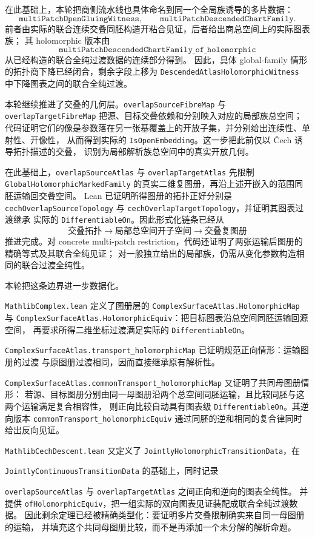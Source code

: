 \documentclass[UTF8,fontset=none,a4paper,11pt]{ctexart}
\begin{document}
在此基础上，本轮把商侧流水线也具体命名到同一个全局族诱导的多片数据：
\[
\texttt{multiPatchOpenGluingWitness},\qquad
\texttt{multiPatchDescendedChartFamily}.
\]
前者由实际的联合连续交叠同胚构造开粘合见证，后者给出商总空间上的实际图表族；
其 holomorphic 版本由
\[
\texttt{multiPatchDescendedChartFamily\_of\_holomorphic}
\]
从已经构造的联合全纯过渡数据的连续部分得到。
因此，具体 global-family 情形的拓扑商下降已经闭合，剩余字段上移为
\texttt{DescendedAtlasHolomorphicWitness} 中下降图表之间的联合全纯过渡。

本轮继续推进了交叠的几何层。\texttt{overlapSourceFibreMap} 与
\texttt{overlapTargetFibreMap} 把源、目标交叠依赖和分别映入对应的局部族总空间；
代码证明它们的像是参数落在另一张基覆盖上的开放子集，并分别给出连续性、单射性、开像性，
从而得到实际的 \texttt{IsOpenEmbedding}。这一步把此前仅以 Čech 诱导拓扑描述的交叠，
识别为局部解析族总空间中的真实开放几何。

在此基础上，\texttt{overlapSourceAtlas\allowbreak} 与
\texttt{overlapTargetAtlas\allowbreak} 先限制
\texttt{GlobalHolomorphic\allowbreak MarkedFamily} 的真实二维复图册，再沿上述开嵌入的范围同胚运输回交叠空间。
Lean 已证明所得图册的拓扑正好分别是
\texttt{cechOverlapSourceTopology} 与 \texttt{cechOverlapTargetTopology}，并证明其图表过渡继承
实际的 \texttt{DifferentiableOn}。因此形式化链条已经从
\[
  \text{交叠拓扑}\longrightarrow\text{局部总空间开子空间}
\longrightarrow\text{交叠复图册}
\]
推进完成。对 concrete multi-patch restriction，代码还证明了两张运输后图册的精确等式及其联合全纯见证；
对一般独立给出的局部族，仍需从变化参数构造相同的联合过渡全纯性。

本轮把这条边界进一步数据化。
\par
\texttt{MathlibComplex.\allowbreak lean} 定义了图册层的
\texttt{ComplexSurfaceAtlas.\allowbreak HolomorphicMap} 与
\texttt{ComplexSurfaceAtlas.\allowbreak HolomorphicEquiv}：把目标图表沿总空间同胚运输回源空间，
再要求所得二维坐标过渡满足实际的 \texttt{Differentiable\allowbreak On}。
\par
\texttt{ComplexSurfaceAtlas.\allowbreak transport\_holomorphic\allowbreak Map} 已证明规范正向情形：运输图册的过渡
与原图册过渡相同，因而直接继承原有解析性。
\par
\texttt{ComplexSurfaceAtlas.\allowbreak commonTransport\_holomorphic\allowbreak Map} 又证明了共同母图册情形：
若源、目标图册分别由同一母图册沿两个总空间同胚运输，且比较同胚与这两个运输满足复合相容性，
则正向比较自动具有图表级 \texttt{Differentiable\allowbreak On}。其逆向版本
\texttt{commonTransport\_holomorphic\allowbreak Equiv} 通过同胚的逆和相同的复合律同时给出反向见证。
\par
\texttt{MathlibCechDescent.\allowbreak lean} 又定义了
\texttt{JointlyHolomorphic\allowbreak TransitionData}，在
\par
\texttt{JointlyContinuous\allowbreak TransitionData} 的基础上，同时记录
\par
\texttt{overlapSourceAtlas} 与 \texttt{overlapTargetAtlas} 之间正向和逆向的图表全纯性。
并提供 \texttt{ofHolomorphic\allowbreak Equiv}，把一组实际的双向图表见证装配成联合全纯过渡数据。
因此剩余定理已经被精确类型化：要证明多片交叠限制确实来自同一母图册的运输，
并填充这个共同母图册比较，而不是再添加一个未分解的解析命题。
\end{document}

